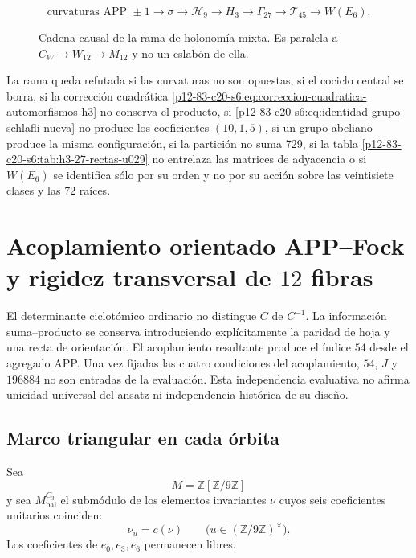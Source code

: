\begin{figure}[htbp]
\centering
\[
 \text{curvaturas APP }\pm1
 \longrightarrow\sigma
 \longrightarrow\mathcal H_9
 \longrightarrow H_3
 \longrightarrow\Gamma_{27}
 \longrightarrow\mathcal T_{45}
 \longrightarrow W(E_6).
\]
\caption{Cadena causal de la rama de holonomía mixta. Es paralela a
\(C_W\to W_{12}\to M_{12}\) y no un eslabón de ella.}
\label{p12-83-c20-s6:fig:cadena-holonomia-e6-u029}
\end{figure}

\begin{criterion}
\label{p12-83-c20-s6:crit:refutacion-rama-e6-u029}
La rama queda refutada si las curvaturas no son opuestas, si el cociclo
central se borra, si la corrección cuadrática
\eqref{p12-83-c20-s6:eq:correccion-cuadratica-automorfismos-h3} no conserva el producto,
si \eqref{p12-83-c20-s6:eq:identidad-grupo-schlafli-nueva} no produce los coeficientes
\((10,1,5)\), si un grupo abeliano produce la misma configuración, si la
partición no suma 729, si la tabla
\ref{p12-83-c20-s6:tab:h3-27-rectas-u029} no entrelaza las matrices de adyacencia o si
\(W(E_6)\) se identifica sólo por su orden y no por su acción sobre las
veintisiete clases y las 72 raíces.
\end{criterion}


\section{Acoplamiento orientado APP–Fock y rigidez transversal de \(12\) fibras}
\label{p12-83-c20-s7:chap:acoplamiento-app-fock}

El determinante ciclotómico ordinario no distingue \(C\) de \(C^{-1}\).
La información suma--producto se conserva introduciendo explícitamente la
paridad de hoja y una recta de orientación. El acoplamiento resultante
produce el índice \(54\) desde el agregado APP. Una vez fijadas las cuatro
condiciones del acoplamiento, \(54\), \(J\) y \(196884\) no son entradas de
la evaluación. Esta independencia evaluativa no afirma unicidad universal
del ansatz ni independencia histórica de su diseño.

\subsection{Marco triangular en cada órbita}

Sea
\[
M=\mathbb Z[\mathbb Z/9\mathbb Z]
\]
y sea \(M_{\mathrm{bal}}^{C_3}\) el submódulo de los elementos invariantes
\(\nu\) cuyos seis coeficientes unitarios coinciden:
\[
\nu_u=c(\nu)
\qquad
\bigl(u\in(\mathbb Z/9\mathbb Z)^\times\bigr).
\]
Los coeficientes de \(e_0,e_3,e_6\) permanecen libres.

